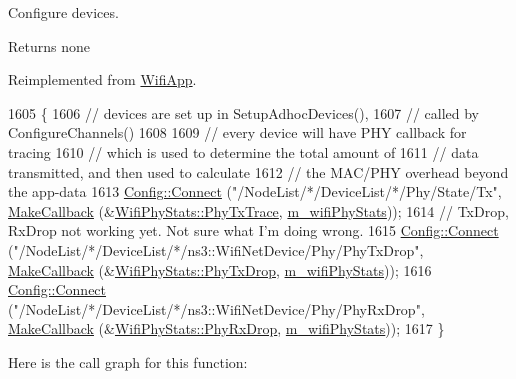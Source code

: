 Configure devices. 

\begin{DoxyReturn}{Returns}
none 
\end{DoxyReturn}


Reimplemented from \hyperlink{classWifiApp_aee8f24cd14672226889e0572fe3cc4e3}{Wifi\+App}.


\begin{DoxyCode}
1605 \{
1606   \textcolor{comment}{// devices are set up in SetupAdhocDevices(),}
1607   \textcolor{comment}{// called by ConfigureChannels()}
1608 
1609   \textcolor{comment}{// every device will have PHY callback for tracing}
1610   \textcolor{comment}{// which is used to determine the total amount of}
1611   \textcolor{comment}{// data transmitted, and then used to calculate}
1612   \textcolor{comment}{// the MAC/PHY overhead beyond the app-data}
1613   \hyperlink{group__config_ga4014f151241cd0939b6cb64409605736}{Config::Connect} (\textcolor{stringliteral}{"/NodeList/*/DeviceList/*/Phy/State/Tx"}, 
      \hyperlink{group__makecallbackmemptr_ga9376283685aa99d204048d6a4b7610a4}{MakeCallback} (&\hyperlink{classWifiPhyStats_a75fdca29ad6797328d2a519684ca73fb}{WifiPhyStats::PhyTxTrace}, 
      \hyperlink{classVanetRoutingExperiment_a6b7260aa3838c95f5a839d0cea09393f}{m\_wifiPhyStats}));
1614   \textcolor{comment}{// TxDrop, RxDrop not working yet.  Not sure what I'm doing wrong.}
1615   \hyperlink{group__config_ga4014f151241cd0939b6cb64409605736}{Config::Connect} (\textcolor{stringliteral}{"/NodeList/*/DeviceList/*/ns3::WifiNetDevice/Phy/PhyTxDrop"}, 
      \hyperlink{group__makecallbackmemptr_ga9376283685aa99d204048d6a4b7610a4}{MakeCallback} (&\hyperlink{classWifiPhyStats_a048093e02ee77d6f6529308b285eae7d}{WifiPhyStats::PhyTxDrop}, 
      \hyperlink{classVanetRoutingExperiment_a6b7260aa3838c95f5a839d0cea09393f}{m\_wifiPhyStats}));
1616   \hyperlink{group__config_ga4014f151241cd0939b6cb64409605736}{Config::Connect} (\textcolor{stringliteral}{"/NodeList/*/DeviceList/*/ns3::WifiNetDevice/Phy/PhyRxDrop"}, 
      \hyperlink{group__makecallbackmemptr_ga9376283685aa99d204048d6a4b7610a4}{MakeCallback} (&\hyperlink{classWifiPhyStats_a004c70c37e1a663736dd094fd6703939}{WifiPhyStats::PhyRxDrop}, 
      \hyperlink{classVanetRoutingExperiment_a6b7260aa3838c95f5a839d0cea09393f}{m\_wifiPhyStats}));
1617 \}
\end{DoxyCode}


Here is the call graph for this function\+:


